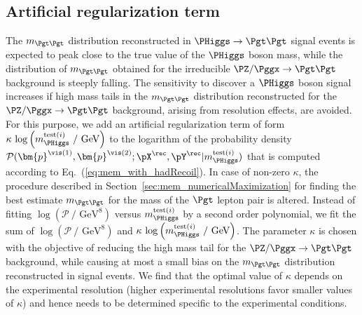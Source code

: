 \subsection{Artificial regularization term}
\label{sec:mem_logM}

The $m_{\Pgt\Pgt}$ distribution reconstructed in $\PHiggs \to \Pgt\Pgt$ signal events is expected to peak close to the true value of the $\PHiggs$ boson mass,
while the distribution of $m_{\Pgt\Pgt}$ obtained for the irreducible $\PZ/\Pggx \to \Pgt\Pgt$ background is steeply falling.
The sensitivity to discover a $\PHiggs$ boson signal increases if high mass tails in the $m_{\Pgt\Pgt}$ distribution reconstructed 
for the $\PZ/\Pggx \to \Pgt\Pgt$ background, arising from resolution effects, are avoided.
For this purpose,
we add an artificial regularization term of form 
$\kappa \, \log \left( m_{\PHiggs}^{\textrm{test}(i)}~/\mbox{~GeV} \right)$ 
to the logarithm of the probability density $\mathcal{P}(\bm{p}^{\vis(1)},\bm{p}^{\vis(2)};\pX^{\rec},\pY^{\rec}|m_{\PHiggs}^{\textrm{test}(i)})$
that is computed according to Eq.~(\ref{eq:mem_with_hadRecoil}).
In case of non-zero $\kappa$,
the procedure described in Section~\ref{sec:mem_numericalMaximization} for finding the best estimate $m_{\Pgt\Pgt}$ for the mass of the $\Pgt$ lepton pair is altered.
Instead of fitting 
$\log \left( \mathcal{P}~/\mbox{~GeV}^{8} \right)$ 
versus $m_{\PHiggs}^{\textrm{test}(i)}$ by a second order polynomial,
we fit the sum of $\log \left( \mathcal{P}~/\mbox{~GeV}^{8} \right)$
and $\kappa \, \log \left( m_{\PHiggs}^{\textrm{test}(i)}~/\mbox{~GeV} \right)$.
The parameter $\kappa$ is chosen with the objective of reducing the high mass tail for the $\PZ/\Pggx \to \Pgt\Pgt$ background,
while causing at most a small bias on the $m_{\Pgt\Pgt}$ distribution reconstructed in signal events.
We find that the optimal value of $\kappa$ depends on the experimental resolution
(higher experimental resolutions favor smaller values of $\kappa$) and hence needs to be determined specific to the experimental conditions.
